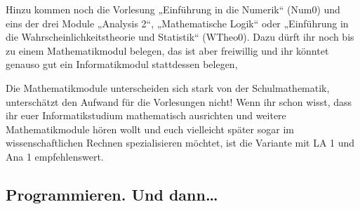 Hinzu kommen noch die Vorlesung „Einführung in die Numerik“ (\gls{Num0}) und eins der drei Module „Analysis 2“, „Mathematische Logik“ oder „Einführung in die Wahrscheinlichkeitstheorie und Statistik“ (\gls{WTheo0}). Dazu dürft ihr noch bis zu einem Mathematikmodul belegen, das ist aber freiwillig und ihr könntet genauso gut ein Informatikmodul stattdessen belegen,

Die Mathematikmodule unterscheiden sich stark von der Schulmathematik, unterschätzt den Aufwand für die Vorlesungen nicht! Wenn ihr schon wisst, dass ihr euer Informatikstudium mathematisch ausrichten und weitere Mathematikmodule hören wollt und euch vielleicht später sogar im wissenschaftlichen Rechnen spezialisieren möchtet, ist die Variante mit LA 1 und Ana 1 empfehlenswert.

\subsection{Programmieren. Und dann\dots}

